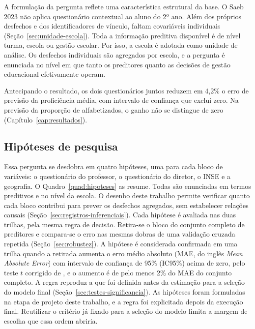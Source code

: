 A formulação da pergunta reflete uma característica estrutural da base. O
Saeb 2023 não aplica questionário contextual ao aluno do 2º ano. Além dos
próprios desfechos e dos identificadores de vínculo, faltam covariáveis
individuais (Seção~\ref{sec:unidade-escola}). Toda a informação preditiva
disponível é de nível turma, escola ou gestão escolar. Por isso, a escola é
adotada como unidade de análise. Os desfechos individuais são agregados por
escola, e a pergunta é enunciada no nível em que tanto os preditores
quanto as decisões de gestão educacional efetivamente operam.

Antecipando o resultado, os dois questionários juntos reduzem em 4,2\% o
erro de previsão da proficiência média, com intervalo de confiança que
exclui zero. Na previsão da proporção de alfabetizados, o ganho não se
distingue de zero (Capítulo~\ref{cap:resultados}).

\subsection{Hipóteses de pesquisa}
\label{sec:hipoteses}

Essa pergunta se desdobra em quatro hipóteses, uma para cada bloco de
variáveis: o questionário do professor, o questionário do diretor, o INSE e
a geografia. O Quadro~\ref{quad:hipoteses} as resume. Todas são enunciadas
em termos preditivos e no nível da escola. O desenho deste trabalho permite
verificar quanto cada bloco contribui para prever os desfechos agregados,
sem estabelecer relações causais (Seção~\ref{sec:registros-inferenciais}).
Cada hipótese é avaliada nas duas trilhas, pela mesma regra de decisão.
Retira-se o bloco do conjunto completo de preditores e compara-se o erro
nas mesmas dobras de uma validação cruzada repetida
(Seção~\ref{sec:robustez}). A hipótese é considerada confirmada em uma
trilha quando a retirada aumenta o erro médio absoluto (MAE, do inglês
\textit{Mean Absolute Error}) com intervalo de confiança de 95\% (IC95\%)
acima de zero, pelo teste $t$ corrigido de ,
e o aumento é de pelo menos 2\% do MAE do conjunto completo. A regra
reproduz a que foi definida antes da estimação para a seleção do modelo
final (Seção~\ref{sec:testes-significancia}). As hipóteses foram formuladas na
etapa de projeto deste trabalho, e a regra foi explicitada depois da
execução final. Reutilizar o critério já fixado para a seleção do modelo
limita a margem de escolha que essa ordem abriria.

